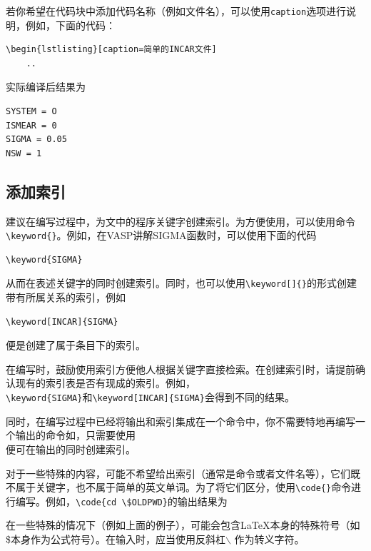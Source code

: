 \begin{attention}
    若你希望在代码块中添加代码名称（例如文件名），可以使用\verb|caption|选项进行说明，例如，下面的代码：
    \begin{lstlisting}[frame=line]
\begin{lstlisting}[caption=简单的INCAR文件]
    ..        
    \end{lstlisting}

    实际编译后结果为
    \begin{lstlisting}[caption=简单的INCAR文件]
SYSTEM = O
ISMEAR = 0
SIGMA = 0.05
NSW = 1
    \end{lstlisting}

\end{attention}

\subsection{添加索引}

建议在编写过程中，为文中的程序关键字创建索引。为方便使用，可以使用命令\verb|\keyword{}|。例如，在VASP讲解SIGMA函数时，可以使用下面的代码

\begin{lstlisting}[frame=line]
\keyword{SIGMA}
\end{lstlisting}

从而在表述关键字的同时创建索引。同时，也可以使用\verb|\keyword[]{}|的形式创建带有所属关系的索引，例如

\begin{lstlisting}[frame=line]
\keyword[INCAR]{SIGMA}
\end{lstlisting}

便是创建了属于条目下的索引。

\begin{attention}
    在编写时，鼓励使用索引方便他人根据关键字直接检索。在创建索引时，请提前确认现有的索引表是否有现成的索引。例如，\\\verb|\keyword{SIGMA}|和\verb|\keyword[INCAR]{SIGMA}|会得到不同的结果。

    同时，在编写过程中已经将输出和索引集成在一个命令中，你不需要特地再编写一个输出的命令如，只需要使用\\便可在输出的同时创建索引。
\end{attention}

对于一些特殊的内容，可能不希望给出索引（通常是命令或者文件名等），它们既不属于关键字，也不属于简单的英文单词。为了将它们区分，使用\verb|\code{}|命令进行编写。例如，\verb|\code{cd \$OLDPWD}|的输出结果为

\begin{attention}
    在一些特殊的情况下（例如上面的例子），可能会包含\LaTeX 本身的特殊符号（如\$本身作为公式符号）。在输入时，应当使用反斜杠$\backslash$ 作为转义字符。
\end{attention}
